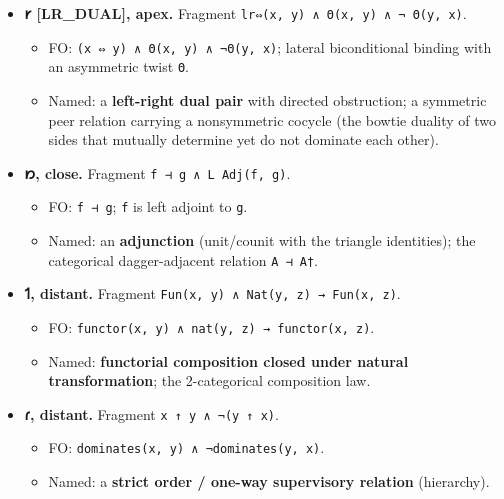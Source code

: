 \begin{itemize}
\tightlist
\item
  \textbf{𐑾 {[}LR\_DUAL{]}, apex.} Fragment
  \texttt{lr⇔(x,\ y)\ ∧\ Θ(x,\ y)\ ∧\ ¬\ Θ(y,\ x)}.

  \begin{itemize}
  \tightlist
  \item
    FO: \texttt{(x\ ⇔\ y)\ ∧\ Θ(x,\ y)\ ∧\ ¬Θ(y,\ x)}; lateral
    biconditional binding with an asymmetric twist \texttt{Θ}.
  \item
    Named: a \textbf{left-right dual pair} with directed obstruction; a
    symmetric peer relation carrying a nonsymmetric cocycle (the bowtie
    duality of two sides that mutually determine yet do not dominate
    each other).
  \end{itemize}
\item
  \textbf{𐑽, close.} Fragment \texttt{f\ ⊣\ g\ ∧\ L\ Adj(f,\ g)}.

  \begin{itemize}
  \tightlist
  \item
    FO: \texttt{f\ ⊣\ g}; \texttt{f} is left adjoint to \texttt{g}.
  \item
    Named: an \textbf{adjunction} (unit/counit with the triangle
    identities); the categorical dagger-adjacent relation
    \texttt{A\ ⊣\ A†}.
  \end{itemize}
\item
  \textbf{𐑑, distant.} Fragment
  \texttt{Fun(x,\ y)\ ∧\ Nat(y,\ z)\ →\ Fun(x,\ z)}.

  \begin{itemize}
  \tightlist
  \item
    FO: \texttt{functor(x,\ y)\ ∧\ nat(y,\ z)\ →\ functor(x,\ z)}.
  \item
    Named: \textbf{functorial composition closed under natural
    transformation}; the 2-categorical composition law.
  \end{itemize}
\item
  \textbf{𐑩, distant.} Fragment \texttt{x\ ↑\ y\ ∧\ ¬(y\ ↑\ x)}.

  \begin{itemize}
  \tightlist
  \item
    FO: \texttt{dominates(x,\ y)\ ∧\ ¬dominates(y,\ x)}.
  \item
    Named: a \textbf{strict order / one-way supervisory relation}
    (hierarchy).
  \end{itemize}
\end{itemize}

